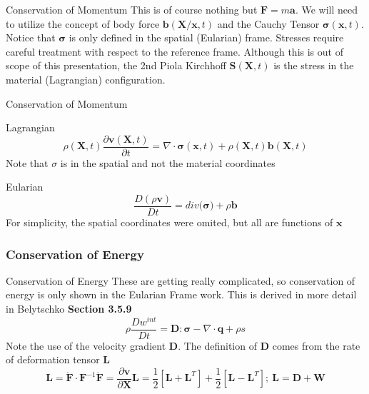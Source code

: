 \documentclass{beamer}
\begin{document}
\begin{frame}{Conservation of Momentum}
This is of course nothing but $\mathbf{F}=m\mathbf{a}$.
\linebreak
We will need to utilize the concept of body force $\mathbf{b}(\mathbf{X/x},t)$
and the Cauchy Tensor $\mathbf{\sigma}(\mathbf{x},t)$. Notice that $\mathbf{\sigma}$ is only defined in the spatial (Eularian) frame. Stresses require careful treatment with respect to the reference frame. Although this is out of scope of this presentation, the 2nd Piola Kirchhoff $\mathbf{S}(\mathbf{X},t)$ is the stress in the material (Lagrangian) configuration.
\end{frame}

\begin{frame}{Conservation of Momentum}
\begin{block}{Lagrangian}
	\begin{equation}
		\rho(\mathbf{X},t)\frac{\partial\mathbf{v}(\mathbf{X},t)}{\partial t}=\nabla\cdot\bm{\sigma}(\mathbf{x},t)+\rho(\mathbf{X},t)\mathbf{b}(\mathbf{X},t)
	\end{equation}
	Note that $\sigma$ is in the spatial and not the material coordinates
\end{block}

\begin{block}{Eularian}
	\begin{equation}
		\frac{D(\rho\mathbf{v})}{Dt}=div(\bm{\sigma)}+\rho\mathbf{b}
	\end{equation}
	For simplicity, the spatial coordinates were omited, but all are functions of $\mathbf{x}$
\end{block}
\end{frame}

\subsubsection{Conservation of Energy}

\begin{frame}{Conservation of Energy}
These are getting really complicated, so conservation of energy is only shown in the Eularian Frame work.
This is derived in more detail in Belytschko \textbf{Section 3.5.9}
	\begin{equation}
		\rho\frac{ Dw^{int} }{Dt}=\mathbf{D}:\bm{\sigma}-\nabla\cdot\mathbf{q}+\rho s
	\end{equation}
	Note the use of the velocity gradient $\mathbf{D}$. The definition of $\mathbf{D}$ comes from the rate of deformation tensor $\mathbf{L}$
	\begin{subequations}
		\begin{equation}
			\mathbf{L}=\dot{\mathbf{F}}\cdot\mathbf{F}^{-1}
		\end{equation}
		\begin{equation}
			\dot{\mathbf{F}}=\frac{\partial \mathbf{v}}{\partial \mathbf{X}}
		\end{equation}
		\begin{equation}
			\mathbf{L}=\frac{1}{2}[\mathbf{L}+\mathbf{L}^{T}]+\frac{1}{2}[\bm{L}-\bm{L}^{T}];\
			\bm{L}=\bm{D}+\bm{W}
		\end{equation}
	\end{subequations}
\end{frame}
\end{document}
